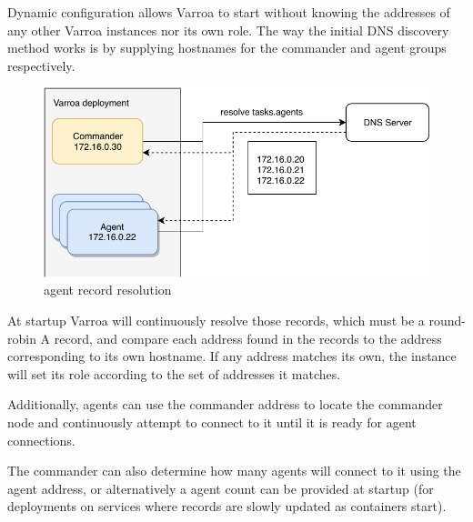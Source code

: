 Dynamic configuration allows Varroa to start without knowing the addresses of any other Varroa instances nor its own role. The way the initial DNS discovery method works is by supplying hostnames for the commander and agent groups respectively.


\begin{figure}[h]
\begin{center}
\includegraphics[scale=0.65]{Resources/PDF/ExecutionDnsDiscovery}
\caption{agent record resolution}
\end{center}
\end{figure}

At startup Varroa will continuously resolve those records, which must be a round-robin A record, and compare each address found in the records to the address corresponding to its own hostname. If any address matches its own, the instance will set its role according to the set of addresses it matches.

Additionally, agents can use the commander address to locate the commander node and continuously attempt to connect to it until it is ready for agent connections.

The commander can also determine how many agents will connect to it using the agent address, or alternatively a agent count can be  provided at startup (for deployments on services where records are slowly updated as containers start).
